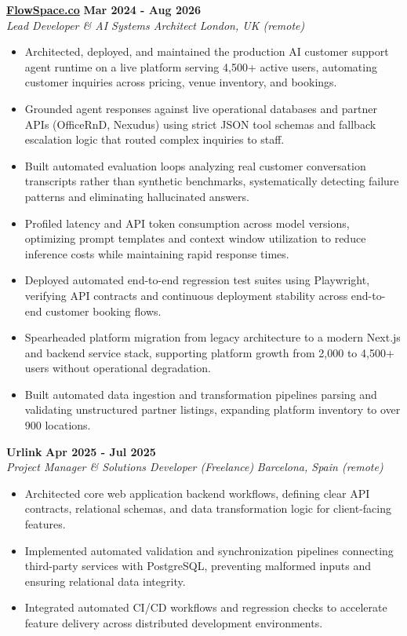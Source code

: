 \documentclass[10pt,a4paper]{article}
\newcommand{\role}[4]{%
  \textbf{#1} \hfill \textbf{#2}\\[1pt]%
  \textit{#3} \hfill \textit{#4}\\[2pt]%
}
\begin{document}
\role{\href{https://flowspace.co}{FlowSpace.co}}{Mar 2024 - Aug 2026}{Lead Developer \& AI Systems Architect}{London, UK (remote)}
\begin{itemize}
  \item Architected, deployed, and maintained the production AI customer support agent runtime on a live platform serving 4,500+ active users, automating customer inquiries across pricing, venue inventory, and bookings.
  \item Grounded agent responses against live operational databases and partner APIs (OfficeRnD, Nexudus) using strict JSON tool schemas and fallback escalation logic that routed complex inquiries to staff.
  \item Built automated evaluation loops analyzing real customer conversation transcripts rather than synthetic benchmarks, systematically detecting failure patterns and eliminating hallucinated answers.
  \item Profiled latency and API token consumption across model versions, optimizing prompt templates and context window utilization to reduce inference costs while maintaining rapid response times.
  \item Deployed automated end-to-end regression test suites using Playwright, verifying API contracts and continuous deployment stability across end-to-end customer booking flows.
  \item Spearheaded platform migration from legacy architecture to a modern Next.js and backend service stack, supporting platform growth from 2,000 to 4,500+ users without operational degradation.
  \item Built automated data ingestion and transformation pipelines parsing and validating unstructured partner listings, expanding platform inventory to over 900 locations.
\end{itemize}

\role{Urlink}{Apr 2025 - Jul 2025}{Project Manager \& Solutions Developer (Freelance)}{Barcelona, Spain (remote)}
\begin{itemize}
  \item Architected core web application backend workflows, defining clear API contracts, relational schemas, and data transformation logic for client-facing features.
  \item Implemented automated validation and synchronization pipelines connecting third-party services with PostgreSQL, preventing malformed inputs and ensuring relational data integrity.
  \item Integrated automated CI/CD workflows and regression checks to accelerate feature delivery across distributed development environments.
\end{itemize}
\end{document}
